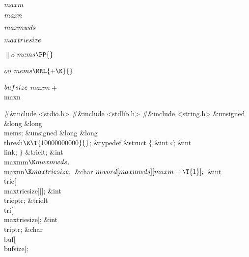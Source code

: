 \Y\B\4\D$\\{maxm}$ \5
\par
\B\4\D$\\{maxn}$ \5
\par
\B\4\D$\\{maxmwds}$ \5
\par
\B\4\D$\\{maxtriesize}$ \5
\par
\B\4\D$\|o$ \5
$\\{mems}\PP{}$\par
\B\4\D$\\{oo}$ \5
$\\{mems}\MRL{+{\K}}{}$\par
\B\4\D$\\{bufsize}$ \5
$\\{maxm}+{}$\\{maxn}\par
\Y\B\8\#\&{include} \.{<stdio.h>}\6
\8\#\&{include} \.{<stdlib.h>}\6
\8\#\&{include} \.{<string.h>}\6
\&{unsigned} \&{long} \&{long} \\{mems};\6
\&{unsigned} \&{long} \&{long} \\{thresh}${}\K\T{10000000000}{}$;\6
\&{typedef} \&{struct} ${}\{{}$\1\6
\&{int} \|c;\6
\&{int} \\{link};\2\6
${}\}{}$ \&{trielt};\6
\&{int} \\{maxmm}${}\K\\{maxmwds},{}$ \\{maxnn}${}\K\\{maxtriesize};{}$\6
\&{char} ${}\\{mword}[\\{maxmwds}][\\{maxm}+\T{1}];{}$\6
\&{int} \\{trie}[\\{maxtriesize}][];\6
\&{int} \\{trieptr};\6
\&{trielt} \\{tri}[\\{maxtriesize}];\6
\&{int} \\{triptr};\6
\&{char} \\{buf}[\\{bufsize}];\6
